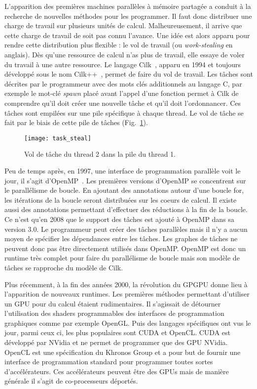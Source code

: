 L'apparition des premières machines parallèles à mémoire partagée a conduit à la recherche de nouvelles méthodes pour les programmer.
%
Il faut donc distribuer une charge de travail sur plusieurs unités de calcul.
%
Malheureusement, il arrive que cette charge de travail de soit pas connu l'avance.
%
Une idée est alors apparu pour rendre cette distribution plus flexible : le vol de travail (ou {\em work-stealing} en anglais).
%
Dès qu'une ressource de calcul n'as plus de travail, elle essaye de voler du travail à une autre ressource.
%
Le langage Cilk~\cite{Cilk}, apparu en 1994 et toujours développé sous le nom Cilk++~\cite{Cilk++}, permet de faire du vol de travail.
%
Les tâches sont décrites par le programmeur avec des mots clés additionnels au langage C, par exemple le mot-clé {\em spawn} placé avant l'appel d'une fonction permet à Cilk de comprendre qu'il doit créer une nouvelle tâche et qu'il doit l'ordonnancer.
%
Ces tâches sont empilées sur une pile spécifique à chaque thread.
%
Le vol de tâche se fait par le biais de cette pile de tâches (Fig.~\ref{fig:task_steal}).

\begin{figure}[t!]
  \centering
  \texttt{[image: task\_steal]}
  \caption{Vol de tâche du thread 2 dans la pile du thread 1.}
  \label{fig:task_steal}
\end{figure}




Peu de temps après, en 1997, une interface de programmation parallèle voit le jour, il s'agit d'OpenMP~\cite{OpenMP}.
%
Les premières versions d'OpenMP se concentrent sur le parallélisme de boucle.
%
En ajoutant des annotations autour d'une boucle for, les itérations de la boucle seront distribuées sur les coeurs de calcul.
%
Il existe aussi des annotations permettant d'effectuer des réductions à la fin de la boucle.
%
Ce n'est qu'en 2008 que le support des tâches est ajouté à OpenMP dans sa version 3.0.
%
Le programmeur peut créer des tâches parallèles mais il n'y a aucun moyen de spécifier les dépendances entre les tâches.
%
Les graphes de tâches ne peuvent donc pas être directement utilisés dans OpenMP.
%
OpenMP est donc un runtime très complet pour faire du parallélisme de boucle mais son modèle de tâches se rapproche du modèle de Cilk.




Plus récemment, à la fin des années 2000, la révolution du GPGPU donne lieu à l'apparition de nouveaux runtimes.
%
Les premières méthodes permettant d'utiliser un GPU pour du calcul étaient rudimentaires.
%
Il s'agissait de détourner l'utilisation des shaders programmables des interfaces de programmation graphiques comme par exemple OpenGL.
%
Puis des langages spécifiques ont vus le jour, parmi ceux ci, les plus populaires sont CUDA et OpenCL.
%
CUDA est développé par NVidia et ne permet de programmer que des GPU NVidia.
%
OpenCL est une spécification du Khronos Group et a pour but de fournir une interface de programmation standard pour programmer toutes sortes d'accélérateurs.
%
Ces accélérateurs peuvent être des GPUs mais de manière générale il s'agit de co-processeurs déportés.




